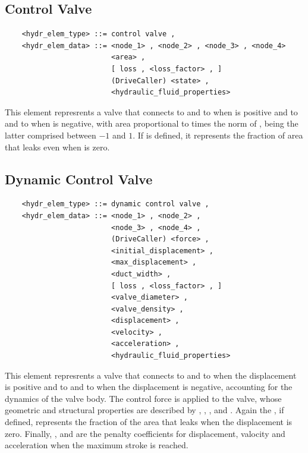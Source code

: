 \subsection{Control Valve}
\begin{verbatim}
    <hydr_elem_type> ::= control valve ,
    <hydr_elem_data> ::= <node_1> , <node_2> , <node_3> , <node_4>
                         <area> ,
                         [ loss , <loss_factor> , ]
                         (DriveCaller) <state> ,
                         <hydraulic_fluid_properties>
\end{verbatim}
This element represrents a valve that connects
 to  and  to 
when  is positive and  to 
and  to  when  is negative,
with area proportional to  times the norm of , 
being the latter comprised between $-1$ and $1$.
If  is defined, it represents the fraction
of area that leaks even when  is zero.



\subsection{Dynamic Control Valve}\label{sec:DYNAMIC_CONTROL_VALVE}
\begin{verbatim}
    <hydr_elem_type> ::= dynamic control valve ,
    <hydr_elem_data> ::= <node_1> , <node_2> ,
                         <node_3> , <node_4> ,
                         (DriveCaller) <force> ,
                         <initial_displacement> ,
                         <max_displacement> ,
                         <duct_width> ,
                         [ loss , <loss_factor> , ]
                         <valve_diameter> ,
                         <valve_density> ,
                         <displacement> ,
                         <velocity> ,
                         <acceleration> ,
                         <hydraulic_fluid_properties>
\end{verbatim}
This element represrents a valve that connects
 to  and  to 
when the displacement is positive and  to 
and  to  when the displacement is negative,
accounting for the dynamics of the valve body.
The control force  is applied to the valve, whose 
geometric and structural properties are described by 
, ,
,  and .
Again the , if defined, represents the fraction
of the area that leaks when the displacement is zero.
Finally, ,  and 
are the penalty coefficients for displacement, valocity and acceleration
when the maximum stroke is reached.




